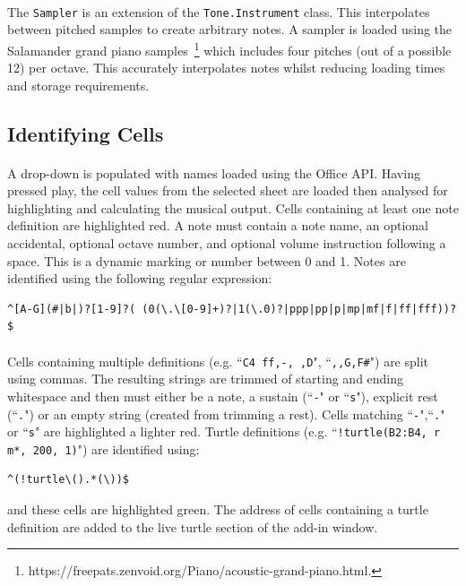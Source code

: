 \paragraph{} The \texttt{Sampler} is an extension of the \texttt{Tone.Instrument} class. This interpolates between pitched samples to create arbitrary notes. A sampler is loaded using the Salamander grand piano samples~\footnote{https://freepats.zenvoid.org/Piano/acoustic-grand-piano.html.} which includes four pitches (out of a possible 12) per octave. This accurately interpolates notes whilst reducing loading times and storage requirements.

\subsection{Identifying Cells}

\paragraph{} A drop-down is populated with names loaded using the Office API. Having pressed play, the cell values from the selected sheet are loaded then analysed for highlighting and calculating the musical output. Cells containing at least one note definition are highlighted red. A note must contain a note name, an optional accidental, optional octave number, and optional volume instruction following a space. This is a dynamic marking or number between 0 and 1. Notes are identified using the following regular expression:

\begin{verbatim}
^[A-G](#|b|)?[1-9]?( (0(\.\[0-9]+)?|1(\.0)?|ppp|pp|p|mp|mf|f|ff|fff))?$
\end{verbatim}

\paragraph{} Cells containing multiple definitions (e.g. ``\texttt{C4 ff,-, ,D}", ``\texttt{,,G,F\#}") are split using commas. The resulting strings are trimmed of starting and ending whitespace and then must either be a note, a sustain (``\texttt{-}" or ``\texttt{s}"), explicit rest (``\texttt{.}") or an empty string (created from trimming a rest). Cells matching ``\texttt{-}",``\texttt{.}" or ``\texttt{s}" are highlighted a lighter red. Turtle definitions (e.g. ``\texttt{!turtle(B2:B4, r m*, 200, 1)}") are identified using:
\begin{verbatim}
^(!turtle\().*(\))$
\end{verbatim}
and these cells are highlighted green. The address of cells containing a turtle definition are added to the live turtle section of the add-in window.

